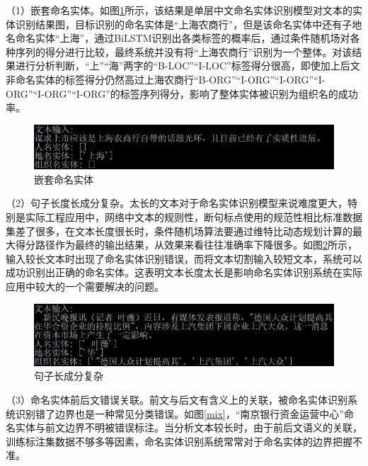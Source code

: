 \documentclass[winfonts,master,oneside,nobackinfo]{njuthesis}
\begin{document}
（1）嵌套命名实体。如图\ref{cascade}所示，该结果是单层中文命名实体识别模型对文本的实体识别结果图，目标识别的命名实体是“上海农商行”，但是该命名实体中还有子地名命名实体“上海”，通过BiLSTM识别出各类标签的概率后，通过条件随机场对各种序列的得分进行比较，最终系统并没有将“上海农商行”识别为一个整体。对该结果进行分析判断，“上”“海”两字的“B-LOC”“I-LOC”标签得分很高，即使加上后文非命名实体的标签得分仍然高过上海农商行“B-ORG”“I-ORG”“I-ORG”“I-ORG”“I-ORG”“I-ORG”的标签序列得分，影响了整体实体被识别为组织名的成功率。

\begin{figure}[H]
\centering
\begin{minipage}[t]{\textwidth}
\includegraphics[width=1\textwidth]{./figure/嵌套命名实体.jpg}
\caption{嵌套命名实体}
\label{cascade}
\end{minipage}
\end{figure}

（2）句子长度长成分复杂。太长的文本对于命名实体识别模型来说难度更大，特别是实际工程应用中，网络中文本的规则性，断句标点使用的规范性相比标准数据集差了很多，在文本长度很长时，条件随机场算法要通过维特比动态规划计算的最大得分路径作为最终的输出结果，从效果来看往往准确率下降很多。如图\ref{long}所示，输入较长文本时出现了命名实体识别错误，而将文本切割输入较短文本，系统可以成功识别出正确的命名实体。这表明文本长度太长是影响命名实体识别系统在实际应用中较大的一个需要解决的问题。


\begin{figure}[H]
\centering
\begin{minipage}[t]{\textwidth}
\includegraphics[width=1\textwidth]{./figure/句子长成分复杂.jpg}
\caption{句子长成分复杂}
\label{long}
\end{minipage}
\end{figure}

（3）命名实体前后文错误关联。前文与后文有含义上的关联，被命名实体识别系统识别错了边界也是一种常见分类错误。如图\ref{mix}，“南京银行资金运营中心”命名实体与前文边界不明被错误标注。当分析文本较长时，由于前后文语义的关联，训练标注集数据不够多等因素，命名实体识别系统常常对于命名实体的边界把握不准。
\end{document}

